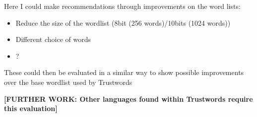 
Here I could make recommendations through improvements on the word lists:

\begin{itemize}
    \item Reduce the size of the wordlist (8bit (256 words)/10bits (1024 words))
    \item Different choice of words
    \item ?
\end{itemize}

These could then be evaluated in a similar way to show possible improvements over the base wordlist used by Trustwords

\textbf{[FURTHER WORK: Other languages found within Trustwords require this evaluation]}